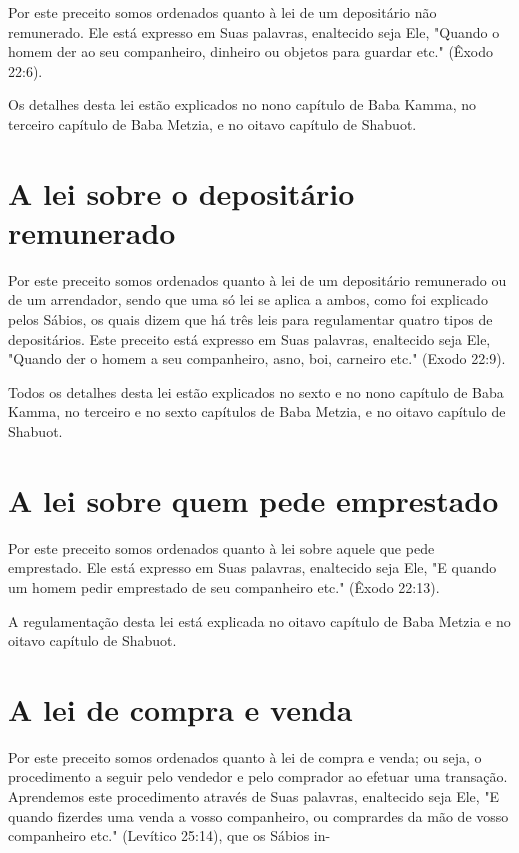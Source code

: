 \begin{itemize}
\begin{enumrate}
\begin{itemize}
\begin{itemize}
\begin{itemize}
Por este preceito somos ordenados quanto à lei de um depositário não
remunerado. Ele está expresso em Suas palavras, enaltecido seja Ele,
"Quando o homem der ao seu companheiro, dinheiro ou objetos para
guar­dar etc." (Êxodo 22:6).

Os detalhes desta lei estão explicados no nono capítulo de Baba Kam­ma,
no terceiro capítulo de Baba Metzia, e no oitavo capítulo de Shabuot.

\section{A lei sobre o depositário remunerado}

Por este preceito somos ordenados quanto à lei de um depositário
remunerado ou de um arrendador, sendo que uma só lei se aplica a ambos,
co­mo foi explicado pelos Sábios, os quais dizem que há três leis para
regulamen­tar quatro tipos de depositários. Este preceito está expresso
em Suas palavras, enaltecido seja Ele, "Quando der o homem a seu
companheiro, asno, boi, car­neiro etc." (Exodo 22:9).

Todos os detalhes desta lei estão explicados no sexto e no nono
ca­pítulo de Baba Kamma, no terceiro e no sexto capítulos de Baba
Metzia, e no oitavo capítulo de Shabuot.

\section{A lei sobre quem pede emprestado}

Por este preceito somos ordenados quanto à lei sobre aquele que pede
emprestado. Ele está expresso em Suas palavras, enaltecido seja Ele, "E
quando um homem pedir emprestado de seu companheiro etc." (Êxodo 22:13).

A regulamentação desta lei está explicada no oitavo capítulo de Ba­ba
Metzia e no oitavo capítulo de Shabuot.

\section{A lei de compra e venda}

Por este preceito somos ordenados quanto à lei de compra e venda; ou
seja, o procedimento a seguir pelo vendedor e pelo comprador ao efetuar
uma transação. Aprendemos este procedimento através de Suas palavras,
enal­tecido seja Ele, "E quando fizerdes uma venda a vosso companheiro,
ou com­prardes da mão de vosso companheiro etc." (Levítico 25:14), que
os Sábios in-




\end{itemize}
\end{itemize}
\end{itemize}
\end{enumrate}
\end{itemize}
